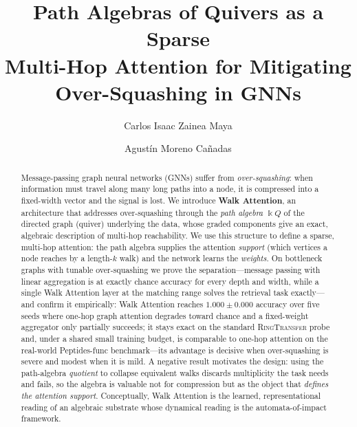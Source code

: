 \documentclass[runningheads]{llncs}
\newcommand{\kk}{\Bbbk}                 %
\newcommand{\kQ}{\kk Q}                 %
\begin{document}
\title{Path Algebras of Quivers as a Sparse\\ Multi-Hop Attention for Mitigating\\ Over-Squashing in GNNs}

\author{Carlos Isaac Zainea Maya \and
Agust\'in Moreno Ca\~nadas}

\maketitle

\begin{abstract}
Message-passing graph neural networks (GNNs) suffer from \emph{over-squashing}:
when information must travel along many long paths into a node, it is compressed
into a fixed-width vector and the signal is lost. We introduce \textbf{Walk
Attention}, an architecture that addresses over-squashing through the
\emph{path algebra} $\kQ$ of the directed graph (quiver) underlying the data,
whose graded components give an exact, algebraic description of multi-hop
reachability. We use this structure to define a sparse, multi-hop attention: the
path algebra supplies the attention \emph{support} (which vertices a node reaches
by a length-$k$ walk) and the network learns the \emph{weights}. On bottleneck
graphs with tunable over-squashing we prove the separation---message passing
with linear aggregation is at exactly chance accuracy for every depth and
width, while a single Walk Attention layer at the matching range solves the
retrieval task exactly---and confirm it empirically: Walk Attention reaches
$1.000\pm0.000$ accuracy over five seeds where one-hop graph attention degrades
toward chance and a fixed-weight aggregator only partially succeeds; it stays
exact on the standard \textsc{RingTransfer} probe and, under a shared small
training budget, is comparable to one-hop attention on the real-world
Peptides-func benchmark---its advantage is decisive when over-squashing is
severe and modest when it is mild. A negative result motivates the
design: using the path-algebra \emph{quotient} to collapse equivalent walks
discards multiplicity the task needs and fails, so the algebra is valuable not for
compression but as the object that \emph{defines the attention support}.
Conceptually, Walk Attention is the learned, representational reading of an
algebraic substrate whose dynamical reading is the automata-of-impact framework.

\end{abstract}
\end{document}
